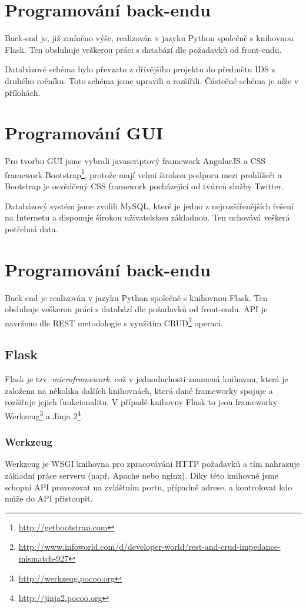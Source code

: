 \documentclass[11pt,a4paper]{article}
\begin{document}
\section*{Programování back-endu}
Back-end je, již zmíněno výše, realizován v jazyku Python společně s knihovnou Flask. Ten obsluhuje veškerou práci s databází dle požadavků od front-endu.

Databázové schéma bylo převzato z dřívějšího projektu do předmětu IDS z druhého ročníku. Toto schéma jsme upravili a rozšířili. Částečné schéma je níže v přílohách.

\section*{Programování GUI}
Pro tvorbu GUI jsme vybrali javascriptový framework AngularJS a CSS framework Bootstrap\footnote{\url{http://getbootstrap.com}}, protože mají velmi širokou podporu mezi prohlížeči a Bootstrap je osvědčený CSS framework pocházející od tvůrců služby Twitter.

Databázový systém jsme zvolili MySQL, které je jedno z nejrozšířenějších řešení na Internetu a disponuje širokou uživatelskou základnou. Ten uchovává veškerá potřebná data.

\section*{Programování back-endu}
Back-end je realizován v jazyku Python společně s knihovnou Flask. Ten obsluhuje veškerou práci s databází dle požadavků od front-endu. API je navrženo dle REST metodologie\cite{rest} s využitím CRUD\footnote{\url{http://www.infoworld.com/d/developer-world/rest-and-crud-impedance-mismatch-927}} operací.

\subsection*{Flask}
Flask je tzv. {\em microframework}, což v jednoduchosti znamená knihovnu, která je založena na několika dalších knihovnách, která dané frameworky spojuje a rozšiřuje jejich funkcionalitu. V případě knihovny Flask to jsou frameworky Werkzeug\footnote{\url{http://werkzeug.pocoo.org}} a Jinja 2\footnote{\url{http://jinja2.pocoo.org}}.

\subsubsection*{Werkzeug}
Werkzeug je WSGI knihovna pro zpracovávání HTTP požadavků a tím nahrazuje základní práce serveru (např. Apache nebo nginx). Díky této knihovně jsme schopni API provozovat na zvláštním portu, případně adrese, a kontrolovat kdo může do API přistoupit.
\end{document}
